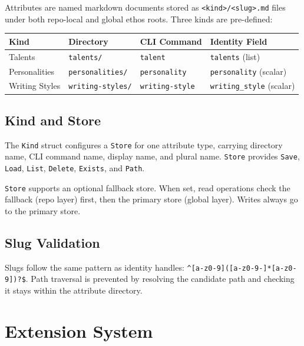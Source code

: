 \documentclass[a4paper,10pt]{article}
\newcommand{\field}[1]{\texttt{#1}}
\newcommand{\cmd}[1]{\texttt{#1}}
\newcommand{\fpath}[1]{\texttt{#1}}
\begin{document}
Attributes are named markdown documents stored as
\fpath{<kind>/<slug>.md} files under both repo-local and global ethos
roots.  Three kinds are pre-defined:

\begin{center}
\begin{tabular}{@{}llll@{}}
\toprule
\textbf{Kind} & \textbf{Directory} & \textbf{CLI Command} &
  \textbf{Identity Field} \\
\midrule
Talents       & \texttt{talents/}       & \cmd{talent}
              & \field{talents} (list) \\
Personalities & \texttt{personalities/} & \cmd{personality}
              & \field{personality} (scalar) \\
Writing Styles & \texttt{writing-styles/} & \cmd{writing-style}
              & \field{writing\_style} (scalar) \\
\bottomrule
\end{tabular}
\end{center}

\subsection{Kind and Store}

The \texttt{Kind} struct configures a \texttt{Store} for one attribute
type, carrying directory name, CLI command name, display name, and
plural name.  \texttt{Store} provides \texttt{Save}, \texttt{Load},
\texttt{List}, \texttt{Delete}, \texttt{Exists}, and \texttt{Path}.

\texttt{Store} supports an optional fallback store.  When set,
read operations check the fallback (repo layer) first, then the
primary store (global layer).  Writes always go to the primary store.

\subsection{Slug Validation}

Slugs follow the same pattern as identity handles:
\verb|^[a-z0-9]([a-z0-9-]*[a-z0-9])?$|.  Path traversal is
prevented by resolving the candidate path and checking it stays
within the attribute directory.

\section{Extension System}
\end{document}
